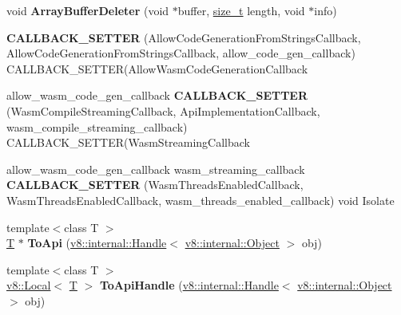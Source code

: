 \begin{DoxyCompactItemize}
void {\bfseries Array\+Buffer\+Deleter} (void $\ast$buffer, \mbox{\hyperlink{classsize__t}{size\+\_\+t}} length, void $\ast$info)
\item 
\mbox{\label{namespacev8_a6ae4c7aa44c832bd3e150707b0a998d3}} 
{\bfseries C\+A\+L\+L\+B\+A\+C\+K\+\_\+\+S\+E\+T\+T\+ER} (Allow\+Code\+Generation\+From\+Strings\+Callback, Allow\+Code\+Generation\+From\+Strings\+Callback, allow\+\_\+code\+\_\+gen\+\_\+callback) C\+A\+L\+L\+B\+A\+C\+K\+\_\+\+S\+E\+T\+T\+ER(Allow\+Wasm\+Code\+Generation\+Callback
\item 
\mbox{\label{namespacev8_ac1dc143d6f4995617813b364117f4034}} 
allow\+\_\+wasm\+\_\+code\+\_\+gen\+\_\+callback {\bfseries C\+A\+L\+L\+B\+A\+C\+K\+\_\+\+S\+E\+T\+T\+ER} (Wasm\+Compile\+Streaming\+Callback, Api\+Implementation\+Callback, wasm\+\_\+compile\+\_\+streaming\+\_\+callback) C\+A\+L\+L\+B\+A\+C\+K\+\_\+\+S\+E\+T\+T\+ER(Wasm\+Streaming\+Callback
\item 
\mbox{\label{namespacev8_a1acc74c6a2dbdb98519c3cbd1223d6d7}} 
allow\+\_\+wasm\+\_\+code\+\_\+gen\+\_\+callback wasm\+\_\+streaming\+\_\+callback {\bfseries C\+A\+L\+L\+B\+A\+C\+K\+\_\+\+S\+E\+T\+T\+ER} (Wasm\+Threads\+Enabled\+Callback, Wasm\+Threads\+Enabled\+Callback, wasm\+\_\+threads\+\_\+enabled\+\_\+callback) void Isolate
\item 
\mbox{\label{namespacev8_a98d47670140d25c3837f86b08c060707}} 
{\footnotesize template$<$class T $>$ }\\\mbox{\hyperlink{classv8_1_1internal_1_1torque_1_1T}{T}} $\ast$ {\bfseries To\+Api} (\mbox{\hyperlink{classv8_1_1internal_1_1Handle}{v8\+::internal\+::\+Handle}}$<$ \mbox{\hyperlink{classv8_1_1internal_1_1Object}{v8\+::internal\+::\+Object}} $>$ obj)
\item 
\mbox{\label{namespacev8_afe7f28d7316bb0f494b0f76055a35b3a}} 
{\footnotesize template$<$class T $>$ }\\\mbox{\hyperlink{classv8_1_1Local}{v8\+::\+Local}}$<$ \mbox{\hyperlink{classv8_1_1internal_1_1torque_1_1T}{T}} $>$ {\bfseries To\+Api\+Handle} (\mbox{\hyperlink{classv8_1_1internal_1_1Handle}{v8\+::internal\+::\+Handle}}$<$ \mbox{\hyperlink{classv8_1_1internal_1_1Object}{v8\+::internal\+::\+Object}} $>$ obj)
\item 
\mbox{\label{namespacev8_aa09eba0b4d6bf92671bbbe002682ae33}} 

\end{DoxyCompactItemize}
